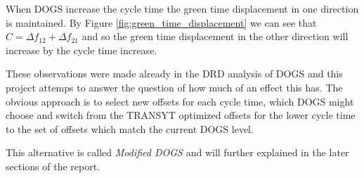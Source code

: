 When DOGS increase the cycle time the green time displacement in one direction is maintained. By Figure \ref{fig:green_time_displacement} we can see that $C = \Delta f_{12} + \Delta f_{21}$ and so the green time displacement in the other direction will increase by the cycle time increase.

These observations were made already in the DRD analysis of DOGS \cite{dogs} and this project attemps to answer the question of how much of an effect this has. The obvious approach is to select new offsets for each cycle time, which DOGS might choose and switch from the TRANSYT optimized offsets for the lower cycle time to the set of offsets which match the current DOGS level.

This alternative is called \textit{Modified DOGS} and will further explained in the later sections of the report.